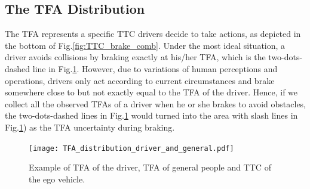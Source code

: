 



\subsection{The TFA Distribution}
\label{subsec:TFADistribution}

The TFA represents a specific TTC drivers decide to take actions, as depicted in the bottom of Fig.\ref{fig:TTC_brake_comb}. Under the most ideal situation, a driver avoids collisions by braking exactly at his/her TFA, which is the two-dots-dashed line in Fig.\ref{fig:TFA_driver_general}. However, due to variations of human perceptions and operations, drivers only act according to current circumstances and brake somewhere close to but not exactly equal to the TFA of the driver. Hence, if we collect all the observed TFAs of a driver when he or she brakes to avoid obstacles, the two-dots-dashed lines in Fig.\ref{fig:TFA_driver_general} would turned into the area with slash lines in Fig.\ref{fig:TFA_driver_general}) as the TFA uncertainty during braking. 


\begin{figure}[htbp!]
\begin{center}
\texttt{[image: TFA\_distribution\_driver\_and\_general.pdf]}
\end{center}
\caption{Example of TFA of the driver, TFA of general people and TTC of the ego vehicle.}
\label{fig:TFA_driver_general} 
\end{figure}


